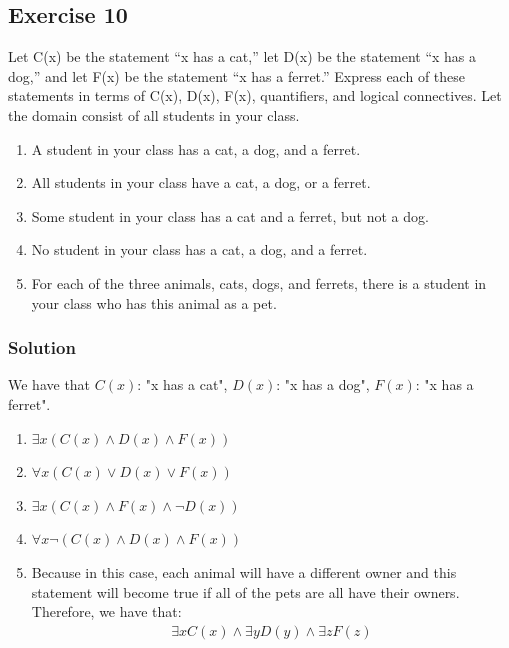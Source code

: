 \documentclass{article}
\begin{document}
\subsection*{Exercise 10}
Let C(x) be the statement “x has a cat,” let D(x) be the statement “x has a dog,” and let F(x) be the statement “x has a ferret.” Express each of these statements in terms of C(x), D(x), F(x), quantifiers, and logical connectives. Let the domain consist of all students in your class.
\begin{enumerate} [label = (\alph*)]
    \item A student in your class has a cat, a dog, and a ferret.
    \item All students in your class have a cat, a dog, or a ferret.
    \item Some student in your class has a cat and a ferret, but not a dog.
    \item No student in your class has a cat, a dog, and a ferret.
    \item For each of the three animals, cats, dogs, and ferrets, there is a student in your class who has this animal as a pet.
\end{enumerate}
\subsubsection*{Solution}
We have that $C(x)$: "x has a cat", $D(x)$: "x has a dog", $F(x)$: "x has a ferret".
\begin{enumerate} [label = (\alph*)]
    \item $\exists x(C(x) \land D(x) \land F(x))$
    \item $\forall x(C(x) \lor D(x) \lor F(x))$
    \item $\exists x(C(x) \land F(x) \land \lnot D(x))$
    \item $\forall x\lnot(C(x) \land D(x) \land F(x))$
    \item
          Because in this case, each animal will have a different owner and this statement will become true if all of the pets are all have their owners. Therefore, we have that:
          \begin{align}
              \exists xC(x) \land \exists yD(y) \land \exists zF(z) \nonumber
          \end{align}
\end{enumerate}
\end{document}
